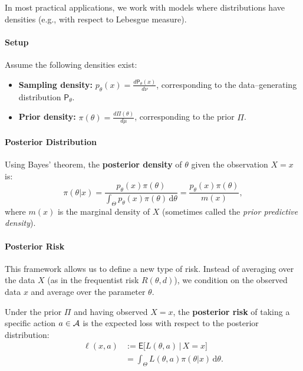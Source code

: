 In most practical applications, we work with models where distributions have densities (e.g., with respect to Lebesgue measure).

\paragraph{Setup}
Assume the following densities exist:
\begin{itemize}
    \item \textbf{Sampling density:} \(p_{\theta}(x) = \frac{d \mathsf{P}_{\theta}(x)}{d \nu} \), corresponding to the data--generating distribution \(\mathsf{P}_{\theta}\).
    \item \textbf{Prior density:} \(\pi(\theta) = \frac{d \Pi(\theta)}{d \mu} \), corresponding to the prior \(\Pi\).
\end{itemize}

\paragraph{Posterior Distribution}
Using Bayes' theorem, the \textbf{posterior density} of \(\theta\) given the observation \(X = x\) is:
\[
\pi(\theta|x) = \frac{p_{\theta}(x)\pi(\theta)}{\int_{\Theta} p_{\theta}(x)\pi(\theta) \, \mathrm{d}\theta} = \frac{p_{\theta}(x)\pi(\theta)}{m(x)},
\]
where \(m(x)\) is the marginal density of \(X\) (sometimes called the \textit{prior predictive density}).

\paragraph{Posterior Risk}
This framework allows us to define a new type of risk. Instead of averaging over the data \(X\) (as in the frequentist risk \(R(\theta, d)\)), we condition on the observed data \(x\) and average over the parameter \(\theta\).

\begin{definition}
\label{def:posterior_risk}
Under the prior \(\Pi\) and having observed \(X = x\), the \textbf{posterior risk} of taking a specific action \(a \in \mathcal{A}\) is the expected loss with respect to the posterior distribution:
\[
\begin{split} 
\ell(x,a) &:= \mathsf{E} \big[ L(\theta,a) \,|\, X = x \big] \\ 
&= \int_{\Theta} L(\theta,a) \pi(\theta|x) \, \mathrm{d}\theta. 
\end{split}
\]
\end{definition}

